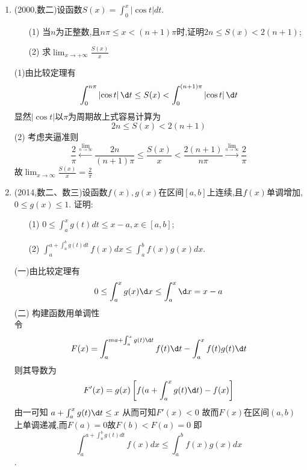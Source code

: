 \documentclass[12pt, a4paper, oneside, UTF8]{ctexbook}
\begin{document}
\begin{enumerate}[label=\arabic*.,start=21]
    \item (2000,数二)设函数$S(x)=\int_0^x|\cos t| dt$.
    \begin{enumerate}[label=(\roman*)]
        \item[(1)] 当$n$为正整数,且$n\pi\leq x<(n+1)\pi$时,证明$2n\leq S(x)<2(n+1)$;
        \item[(2)] 求$\lim_{x\to+\infty}\frac{S(x)}{x}$
    \end{enumerate}
    
    \begin{solution}
    (1)由比较定理有
    $$
    \int_{0}^{n\pi}\left|\cos{t}\right|\d t \leq S(x) < \int_{0}^{(n+1)\pi}\left|\cos{t}\right|\d t
    $$
    显然$\left|\cos{t}\right|$以$\pi$为周期故上式容易计算为
    $$
    2n\leq S(x)<2(n+1)
    $$
    (2) 考虑夹逼准则
    $$
    \frac{2}{\pi}\xleftarrow{\lim_{n\to\infty}}\frac{2n}{(n+1)\pi} \leq \frac{S(x)}{x} < \frac{2(n+1)}{n\pi}\xrightarrow{\lim_{n\to\infty}}\frac{2}{\pi}
    $$
    故$\lim_{x\to\infty}\frac{S(x)}{x}=\frac{2}{\pi}$
    \end{solution}
    
    \item (2014,数二、数三)设函数$f(x), g(x)$在区间$[a, b]$上连续,且$f(x)$单调增加,$0\leq g(x)\leq 1$.
    证明:
    \begin{enumerate}[label=(\roman*)]
        \item[(1)] $0\leq\int_a^x g(t) dt\leq x-a, x\in[a, b]$;
        \item[(2)] $\int_a^{a+\int_a^b g(t) dt} f(x) dx\leq\int_a^b f(x) g(x) dx$.
    \end{enumerate}
    
    \begin{solution}
    (一)由比较定理有 
    $$
    0\leq \int_{a}^{x}g(x)\d x\leq \int_{a}^{x}\d x = x - a 
    $$
    (二) 构建函数用单调性 \\
    令
    $$
    F(x)=\int_{a}^{ma+\int_{a}^{x}g(t)\d t}f(t)\d t - \int_{a}^{x}f(t)g(t)\d t
    $$ 
    则其导数为
    $$
    F'(x)=g(x)\left[f(a+\int_{a}^{x}g(t)\d t)-f(x)\right] 
    $$
    由一可知 $a+\int_{a}^{x}g(t)\d t \leq x$ 
    从而可知$F'(x) < 0$ 故而$F(x)$在区间$(a,b)$上单调递减,而$F(a)=0$故$F(b)<F(a)=0$ 即
    $$
    \int_a^{a+\int_a^b g(t) dt} f(x) dx\leq\int_a^b f(x) g(x) dx
    $$.
    \end{solution}
\end{enumerate}

\ifx\allfiles\undefined
\end{document}
